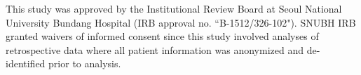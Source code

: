 \documentclass{article}
\begin{document}
This study was approved by the Institutional Review Board at Seoul National University Bundang Hospital (IRB approval no. “B-1512/326-102"). SNUBH IRB granted waivers of informed consent since this study involved analyses of retrospective data where all patient information was anonymized and de-identified prior to analysis.







\end{document}
